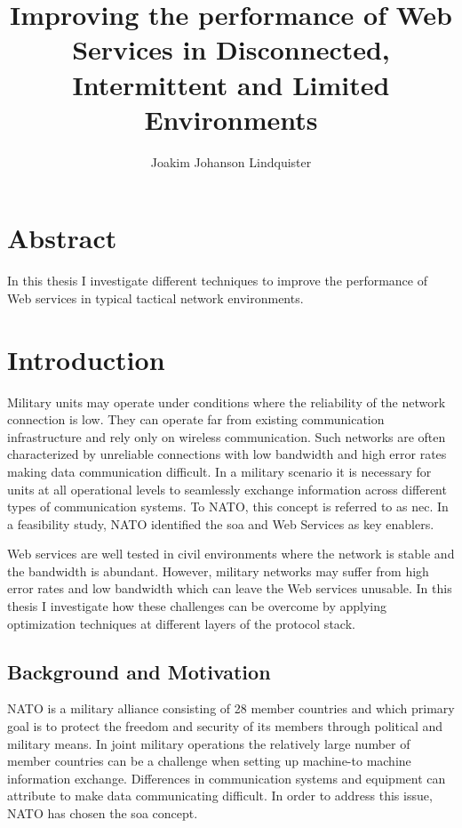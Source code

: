 \documentclass[USenglish]{ifimaster}
\title{Improving the performance of Web Services in Disconnected, Intermittent
and Limited Environments}
\author{Joakim Johanson Lindquister}
\begin{document}
\ififorside{}

\chapter*{Abstract}
In this thesis I investigate different techniques to improve the performance of
Web services in typical tactical network environments.
\pagebreak

\tableofcontents
\listoftables
\listoffigures

\pagebreak


\chapter{Introduction}
Military units may operate under conditions where the reliability of the network
connection is low. They can operate far from existing communication
infrastructure and rely only on wireless communication. Such networks are often
characterized by unreliable connections with low bandwidth and high error rates
making data communication difficult. In a military scenario it is necessary for
units at all operational levels to seamlessly exchange information across
different types of communication systems. To NATO, this concept is referred to
as \gls{nec}. In a feasibility study, NATO identified the \gls{soa} and Web
Services as key enablers\cite{nnec-study}.

Web services are well tested in civil environments where the network is stable
and the bandwidth is abundant. However, military networks may suffer
from high error rates and low bandwidth which can leave the Web services
unusable. In this thesis I investigate how these challenges can be overcome by applying optimization techniques at different layers of the protocol stack.

\section{Background and Motivation}
NATO is a military alliance consisting of 28 member
countries\cite{nato-homepage-member-countries} and which primary goal is to
protect the freedom and security of its members through political and military
means. In joint military operations the relatively large number of member
countries can be a challenge when setting up machine-to machine information
exchange. Differences in communication systems and equipment can attribute to
make data communicating difficult. In order to address this issue, NATO has
chosen the \gls{soa} concept\cite{IST-090}.
\end{document}
